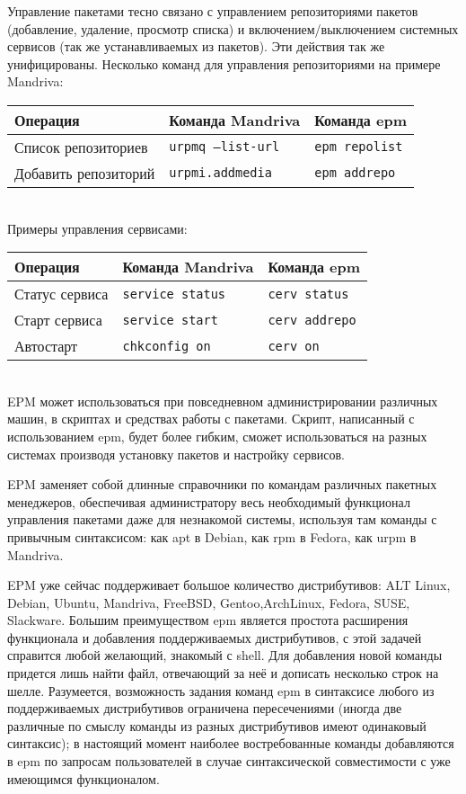 \documentclass[10pt, a5paper]{article}
\def\vv!#1!{\texttt{#1}}
\begin{document}
Управление пакетами тесно связано с управлением репозиториями пакетов (добавление, удаление, просмотр списка) и включением/выключением системных сервисов (так же устанавливаемых из пакетов). Эти действия так же унифицированы. Несколько команд для управления репозиториями на примере Mandriva:

  \begin{tabular}{l|l|l}
    \hline
    Операция & Команда Mandriva & Команда epm \\
    \hline
    Список репозиториев & \vv!urpmq --list-url! & \vv!epm repolist! \\
    Добавить репозиторий & \vv!urpmi.addmedia! & \vv!epm addrepo! \\
    \hline
  \end{tabular}\\

\pagebreak Примеры управления сервисами:

  \begin{tabular}{l|l|l}
    \hline
    Операция & Команда Mandriva & Команда epm \\
    \hline
    Статус сервиса & \vv!service status! & \vv!cerv status! \\
    Старт сервиса & \vv!service start! & \vv!cerv addrepo! \\
    Автостарт & \vv!chkconfig on! & \vv!cerv on! \\
    \hline
  \end{tabular}\\

EPM может использоваться при повседневном администрировании различных машин, в скриптах и средствах работы с пакетами. Скрипт, написанный с использованием epm, будет более гибким, сможет использоваться на разных системах производя установку пакетов и настройку сервисов.

EPM заменяет собой длинные справочники по командам различных пакетных менеджеров, обеспечивая администратору весь необходимый функционал управления пакетами даже для незнакомой системы, используя там команды с привычным синтаксисом: как apt в Debian, как rpm в Fedora, как urpm в Mandriva.

EPM уже сейчас поддерживает большое количество дистрибутивов: ALT Linux, Debian, Ubuntu, Mandriva, FreeBSD, Gentoo,\linebreak ArchLinux, Fedora, SUSE, Slackware. Большим преимуществом epm является простота расширения функционала и добавления поддерживаемых  дистрибутивов, с этой задачей справится любой желающий, знакомый с shell. Для добавления новой команды придется лишь найти файл, отвечающий за неё и дописать несколько строк на шелле.
Разумеется, возможность задания команд epm в синтаксисе любого из поддерживаемых дистрибутивов ограничена пересечениями (иногда две различные по смыслу команды из разных дистрибутивов имеют одинаковый синтаксис); в настоящий момент наиболее востребованные команды добавляются в epm по запросам пользователей в случае синтаксической совместимости с уже имеющимся функционалом.
\end{document}
